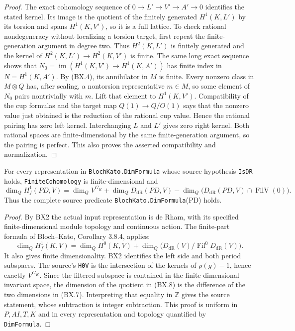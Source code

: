\begin{proof}
The exact cohomology sequence of
$0\to L'\to V'\to A'\to0$ identifies the stated kernel.
Its image is the quotient of the finitely generated
$H^1(K,L')$ by its torsion and spans $H^1(K,V')$, so it is a
full lattice.  To check rational nondegeneracy without
localizing a torsion target, first repeat the finite-generation
argument in degree two.  Thus $H^2(K,L')$ is finitely generated
and the kernel of $H^2(K,L')\to H^2(K,V')$ is finite.
The same long exact sequence shows that
$N_0=\operatorname{im}(H^1(K,V')\to H^1(K,A'))$ has finite
index in $N=H^1(K,A')$.
By (BX.4), its annihilator in $M$ is finite.  Every nonzero
class in $M\otimes Q$ has, after scaling, a nontorsion
representative $m\in M$, so some element of $N_0$ pairs
nontrivially with $m$.  Lift that element to $H^1(K,V')$.
Compatibility of the cup formulas and the target map
$Q(1)\to Q/O(1)$ says that the nonzero value just obtained
is the reduction of the rational cup value.  Hence the
rational pairing has zero left kernel.  Interchanging
$L$ and $L'$ gives zero right kernel.  Both rational spaces
are finite-dimensional by the same finite-generation argument,
so the pairing is perfect.  This also proves the asserted
compatibility and normalization.
\end{proof}

\begin{proposition}
\label{claim:BX4}
For every representation in \texttt{Bloch\allowbreak Kato.\allowbreak Dim\allowbreak Formula}
whose source hypothesis \texttt{Is\allowbreak DR} holds,
\texttt{Finite\allowbreak Cohomology} is finite-dimensional and
\[
 \dim_Q H_f^1(PD,V)
   =\dim_Q V^{G_K}
      +\dim_Q D_{\mathrm{dR}}(PD,V)
      -\dim_Q\bigl(D_{\mathrm{dR}}(PD,V)
                    \cap\operatorname{FilV}(0)\bigr).          \tag{BX.7}
\]
Thus the complete source predicate
\texttt{Bloch\allowbreak Kato.\allowbreak Dim\allowbreak Formula}(PD) holds.
\end{proposition}
\begin{proof}
By BX2 the actual input representation is de Rham, with its
specified finite-dimensional module topology and continuous
action.  The finite-part formula of Bloch--Kato,
Corollary 3.8.4, applies:
\[
 \dim_QH_f^1(K,V)
      =\dim_QH^0(K,V)
          +\dim_Q\bigl(D_{\mathrm{dR}}(V)/
                        \operatorname{Fil}^0D_{\mathrm{dR}}(V)\bigr).
                                                               \tag{BX.8}
\]
It also gives finite dimensionality.  BX2 identifies the left
side and both period subspaces.  The source's \texttt{H0V} is
the intersection of the kernels of $\rho(g)-1$, hence exactly
$V^{G_K}$.  Since the filtered subspace is contained in the
finite-dimensional invariant space, the dimension of the
quotient in (BX.8) is the difference of the two dimensions
in (BX.7).  Interpreting that equality in $\mathbb Z$ gives
the source statement, whose subtraction is integer
subtraction.  This proof is uniform in $P,AI,T,K$ and in every
representation and topology quantified by \texttt{Dim\allowbreak Formula}.
\end{proof}

